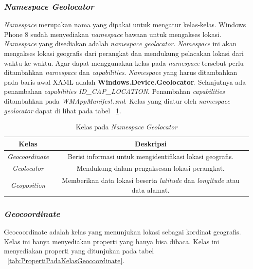\subsubsection{\textit{Namespace Geolocator}}
\label{subsubsec:Namespace Geolocator}
\hspace{0.5cm} \textit{Namespace} merupakan nama yang dipakai untuk mengatur kelas-kelas. Windows Phone 8 sudah menyediakan \textit{namespace} bawaan untuk mengakses lokasi. \textit{Namespace} yang disediakan adalah \textit{namespace geolocator}. \textit{Namespace} ini akan mengakses lokasi geografis dari perangkat dan mendukung pelacakan lokasi dari waktu ke waktu. Agar dapat menggunakan kelas pada \textit{namespace} tersebut perlu ditambahkan \textit{namespace} dan \textit{capabilities}. \textit{Namespace} yang harus ditambahkan pada baris awal XAML adalah \textbf{Windows.Device.Geolocator}. Selanjutnya ada penambahan \textit{capabilities ID\_CAP\_LOCATION}. Penambahan \textit{capabilities} ditambahkan pada \textit{WMAppManifest.xml}. Kelas yang diatur oleh \textit{namespace geolocator} dapat di lihat pada tabel ~\ref{tab:KelasPadaNamespaceGeolocator}\cite{DevWP8}.
\begin{table}[h]
	\centering
		\begin{tabular}{ |c|c|}
				\hline
				Kelas & Deskripsi \\ \hline
				\textit{Geocoordinate} & Berisi informasi untuk mengidentifikasi lokasi geografis. \\ \hline
				\textit{Geolocator} & Mendukung dalam pengaksesan lokasi perangkat. \\ \hline
				\textit{Geoposition} & Memberikan data lokasi beserta \textit{latitude} dan \textit{longitude} atau data alamat. \\ \hline
				\hline
		\end{tabular}
	\caption{Kelas pada \textit{Namespace Geolocator}}
	\label{tab:KelasPadaNamespaceGeolocator}
\end{table}

\subsubsection{\textit{Geocoordinate}}
\label{subsubsec:Kelas Geocoordinate}
\hspace{0.5cm} Geocoordinate adalah kelas yang menunjukan lokasi sebagai kordinat geografis. Kelas ini hanya menyediakan properti yang hanya bisa dibaca. Kelas ini menyediakan properti yang ditunjukan pada tabel ~\ref{tab:PropertiPadaKelasGeocoordinate}.

